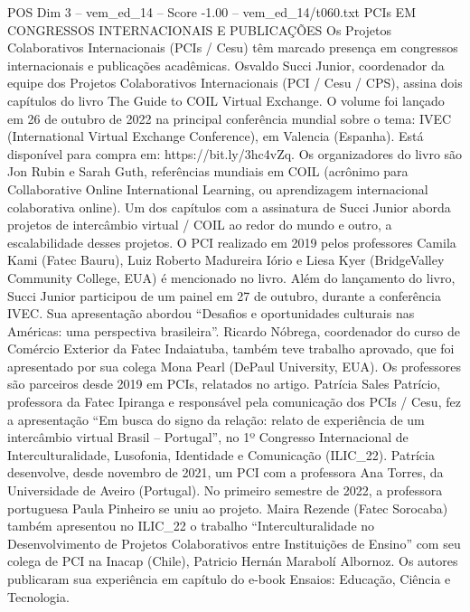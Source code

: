 \begin{textsample}{POS Dim 3 – vem\_ed\_14 – Score -1.00 – vem\_ed\_14/t060.txt}  \label{ex:f3_pos_034}
PCIs EM CONGRESSOS INTERNACIONAIS E PUBLICAÇÕES Os Projetos Colaborativos Internacionais (PCIs / Cesu) têm marcado presença em congressos internacionais e publicações acadêmicas.
Osvaldo Succi Junior, coordenador da equipe dos Projetos Colaborativos Internacionais (PCI / Cesu / CPS), assina dois capítulos do livro The Guide to COIL Virtual Exchange.
O volume foi lançado em 26 de outubro de 2022 na principal conferência mundial sobre o tema: IVEC (International Virtual Exchange Conference), em Valencia (Espanha).
Está disponível para compra em: https://bit.ly/3hc4vZq.
Os organizadores do livro são Jon Rubin e Sarah Guth, referências mundiais em COIL (acrônimo para Collaborative Online International Learning, ou aprendizagem internacional colaborativa online).
Um dos capítulos com a assinatura de Succi Junior aborda projetos de intercâmbio virtual / COIL ao redor do mundo e outro, a escalabilidade desses projetos.
O PCI realizado em 2019 pelos professores Camila Kami (Fatec Bauru), Luiz Roberto Madureira Iório e Liesa Kyer (BridgeValley Community College, EUA) é mencionado no livro.
Além do lançamento do livro, Succi Junior participou de um painel em 27 de outubro, durante a conferência IVEC.
Sua apresentação abordou “Desafios e oportunidades culturais nas Américas: uma perspectiva brasileira”.
Ricardo Nóbrega, coordenador do curso de Comércio Exterior da Fatec Indaiatuba, também teve trabalho aprovado, que foi apresentado por sua colega Mona Pearl (DePaul University, EUA).
Os professores são parceiros desde 2019 em PCIs, relatados no artigo.
Patrícia Sales Patrício, professora da Fatec Ipiranga e responsável pela comunicação dos PCIs / Cesu, fez a apresentação “Em busca do signo da relação: relato de experiência de um intercâmbio virtual Brasil – Portugal”, no 1º Congresso Internacional de Interculturalidade, Lusofonia, Identidade e Comunicação (ILIC\_22).
Patrícia desenvolve, desde novembro de 2021, um PCI com a professora Ana Torres, da Universidade de Aveiro (Portugal).
No primeiro semestre de 2022, a professora portuguesa Paula Pinheiro se uniu ao projeto.
Maira Rezende (Fatec Sorocaba) também apresentou no ILIC\_22 o trabalho “Interculturalidade no Desenvolvimento de Projetos Colaborativos entre Instituições de Ensino” com seu colega de PCI na Inacap (Chile), Patricio Hernán Marabolí Albornoz.
Os autores publicaram sua experiência em capítulo do e-book Ensaios: Educação, Ciência e Tecnologia.

\end{textsample}
